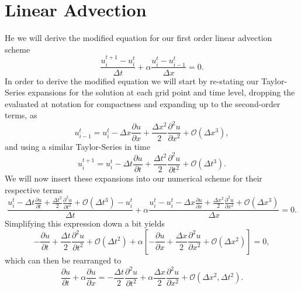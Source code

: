 \section{Linear Advection}
He we will derive the modified equation for our first order linear advection scheme
\begin{equation}
	\frac{u_i^{t+1} - u_{i}^t}{\Delta t} +  \alpha \frac{u_i^{t} - u_{i-1}^{t}}{\Delta x} = 0.
\end{equation}
In order to derive the modified equation we will start by re-stating our Taylor-Series expansions for the solution at each grid point and time level, dropping the evaluated at notation for compactness and expanding up to the second-order terms, as
\begin{equation}
	u_{i-1}^t = u_i^t - \Delta x \frac{\partial u}{\partial x} + \frac{\Delta x^2}{2} \frac{\partial^2 u}{\partial x^2} + \mathcal{O}(\Delta x^3),
\end{equation}
and using a similar Taylor-Series in time
\begin{equation}
	u_{i}^{t+1} = u_i^t - \Delta t \frac{\partial u}{\partial t} + \frac{\Delta t^2}{2} \frac{\partial^2 u}{\partial t^2} + \mathcal{O}(\Delta t^3).
\end{equation}
We will now insert these expansions into our numerical scheme for their respective terms
\begin{equation}
	\frac{u_i^t - \Delta t \frac{\partial u}{\partial t} + \frac{\Delta t^2}{2} \frac{\partial^2 u}{\partial t^2} + \mathcal{O}(\Delta t^3) - u_{i}^t}{\Delta t} +  \alpha \frac{u_i^{t} - u_i^t - \Delta x \frac{\partial u}{\partial x} + \frac{\Delta x^2}{2} \frac{\partial^2 u}{\partial x^2} + \mathcal{O}(\Delta x^3)}{\Delta x} = 0.
\end{equation}
Simplifying this expression down a bit yields
\begin{equation}
	- \frac{\partial u}{\partial t} + \frac{\Delta t}{2} \frac{\partial^2 u}{\partial t^2} + \mathcal{O}(\Delta t^2) +  \alpha \left[ - \frac{\partial u}{\partial x} + \frac{\Delta x}{2} \frac{\partial^2 u}{\partial x^2} + \mathcal{O}(\Delta x^2) \right] = 0,
\end{equation}
which can then be rearranged to
\begin{equation}
	\label{eqn:38fg93la}
	\frac{\partial u}{\partial t} + \alpha \frac{\partial u}{\partial x} = -\frac{\Delta t}{2} \frac{\partial^2 u}{\partial t^2} + \alpha \frac{\Delta x}{2} \frac{\partial^2 u}{\partial x^2} + \mathcal{O}(\Delta x^2,\Delta t^2).
\end{equation}
